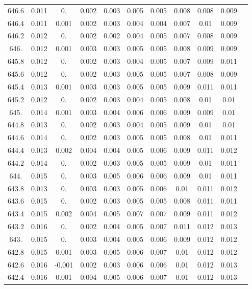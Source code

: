 \documentclass[12pt]{ctexart}
\numberwithin{equation}{section}
\begin{document}
\begin{longtable}{ccccccccccc}
646.6	&	0.011	&	0.	&	0.002	&	0.003	&	0.005	&	0.005	&	0.008	&	0.008	&	0.009	\\
646.4	&	0.011	&	0.001	&	0.002	&	0.003	&	0.004	&	0.004	&	0.007	&	0.01	&	0.009	\\
646.2	&	0.012	&	0.	&	0.002	&	0.002	&	0.004	&	0.005	&	0.007	&	0.008	&	0.009	\\
646.	&	0.012	&	0.001	&	0.003	&	0.003	&	0.005	&	0.005	&	0.008	&	0.009	&	0.009	\\
645.8	&	0.012	&	0.	&	0.002	&	0.003	&	0.004	&	0.005	&	0.007	&	0.009	&	0.011	\\
645.6	&	0.012	&	0.	&	0.002	&	0.003	&	0.005	&	0.005	&	0.007	&	0.008	&	0.009	\\
645.4	&	0.013	&	0.001	&	0.003	&	0.003	&	0.005	&	0.005	&	0.009	&	0.011	&	0.011	\\
645.2	&	0.012	&	0.	&	0.002	&	0.003	&	0.004	&	0.005	&	0.008	&	0.01	&	0.01	\\
645.	&	0.014	&	0.001	&	0.003	&	0.004	&	0.006	&	0.006	&	0.009	&	0.009	&	0.01	\\
644.8	&	0.013	&	0.	&	0.002	&	0.003	&	0.004	&	0.005	&	0.009	&	0.01	&	0.01	\\
644.6	&	0.014	&	0.	&	0.002	&	0.003	&	0.005	&	0.005	&	0.008	&	0.01	&	0.011	\\
644.4	&	0.013	&	0.002	&	0.004	&	0.004	&	0.005	&	0.006	&	0.009	&	0.011	&	0.012	\\
644.2	&	0.014	&	0.	&	0.002	&	0.003	&	0.005	&	0.005	&	0.009	&	0.01	&	0.011	\\
644.	&	0.015	&	0.	&	0.003	&	0.005	&	0.006	&	0.006	&	0.009	&	0.01	&	0.011	\\
643.8	&	0.013	&	0.	&	0.003	&	0.003	&	0.005	&	0.006	&	0.01	&	0.011	&	0.012	\\
643.6	&	0.015	&	0.	&	0.002	&	0.003	&	0.005	&	0.005	&	0.008	&	0.011	&	0.011	\\
643.4	&	0.015	&	0.002	&	0.004	&	0.005	&	0.007	&	0.007	&	0.009	&	0.011	&	0.012	\\
643.2	&	0.016	&	0.	&	0.002	&	0.004	&	0.005	&	0.007	&	0.011	&	0.012	&	0.013	\\
643.	&	0.015	&	0.	&	0.003	&	0.004	&	0.005	&	0.006	&	0.009	&	0.012	&	0.012	\\
642.8	&	0.015	&	0.001	&	0.003	&	0.005	&	0.006	&	0.007	&	0.01	&	0.012	&	0.012	\\
642.6	&	0.016	&	-0.001	&	0.002	&	0.003	&	0.006	&	0.006	&	0.01	&	0.012	&	0.013	\\
642.4	&	0.016	&	0.001	&	0.004	&	0.005	&	0.006	&	0.007	&	0.01	&	0.012	&	0.013	\\

\end{longtable}
\end{document}
